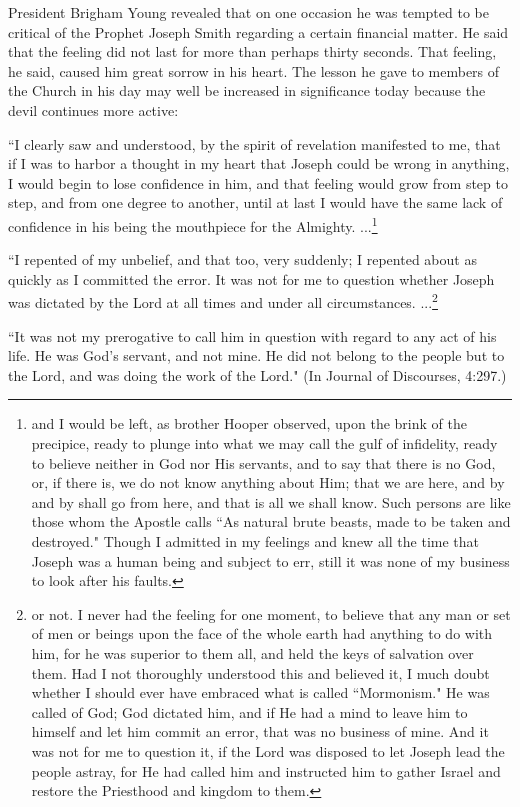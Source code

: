 President Brigham Young revealed that on one occasion he was tempted to be critical of the Prophet Joseph Smith regarding a certain financial matter. He said that the feeling did not last for more than perhaps thirty seconds. That feeling, he said, caused him great sorrow in his heart. The lesson he gave to members of the Church in his day may well be increased in significance today because the devil continues more active:

``I clearly saw and understood, by the spirit of revelation manifested to me, that if I was to harbor a thought in my heart that Joseph could be wrong in anything, I would begin to lose confidence in him, and that feeling would grow from step to step, and from one degree to another, until at last I would have the same lack of confidence in his being the mouthpiece for the Almighty. ...\footnote{and I would be left, as brother Hooper observed, upon the brink of the precipice, ready to plunge into what we may call the gulf of infidelity, ready to believe neither in God nor His servants, and to say that there is no God, or, if there is, we do not know anything about Him; that we are here, and by and by shall go from here, and that is all we shall know. Such persons are like those whom the Apostle calls ``As natural brute beasts, made to be taken and destroyed." Though I admitted in my feelings and knew all the time that Joseph was a human being and subject to err, still it was none of my business to look after his faults.}

``I repented of my unbelief, and that too, very suddenly; I repented about as quickly as I committed the error. It was not for me to question whether Joseph was dictated by the Lord at all times and under all circumstances. ...\footnote{or not. I never had the feeling for one moment, to believe that any man or set of men or beings upon the face of the whole earth had anything to do with him, for he was superior to them all, and held the keys of salvation over them. Had I not thoroughly understood this and believed it, I much doubt whether I should ever have embraced what is called ``Mormonism." He was called of God; God dictated him, and if He had a mind to leave him to himself and let him commit an error, that was no business of mine. And it was not for me to question it, if the Lord was disposed to let Joseph lead the people astray, for He had called him and instructed him to gather Israel and restore the Priesthood and kingdom to them. }

``It was not my prerogative to call him in question with regard to any act of his life. He was God's servant, and not mine. He did not belong to the people but to the Lord, and was doing the work of the Lord." (In Journal of Discourses, 4:297.)

